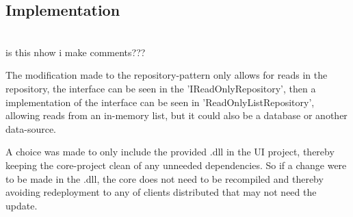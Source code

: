 \subsection{Implementation}
\\is this nhow i make comments???

The modification made to the repository-pattern only allows for reads in the repository, the interface can be seen in the 'IReadOnlyRepository', then a implementation of the interface can be seen in 'ReadOnlyListRepository', allowing reads from an in-memory list, but it could also be a database or another data-source.

A choice was made to only include the provided .dll in the UI project, thereby keeping the core-project clean of any unneeded dependencies. So if a change were to be made in the .dll, the core does not need to be recompiled and thereby avoiding redeployment to any of clients distributed that may not need the update. 

\clearpage
